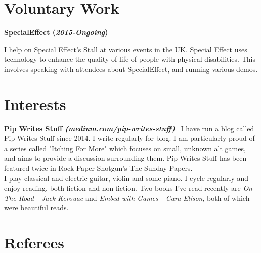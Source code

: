 \documentclass[10pt]{article} %
\begin{document}
\section{Voluntary Work}

\textbf{SpecialEffect (\textit{2015-Ongoing})}

I help on Special Effect's Stall at various events in the UK. Special Effect uses technology to enhance the quality of life of people with physical disabilities. This involves speaking with attendees about SpecialEffect, and running various demos.


\section{Interests}

\textbf{Pip Writes Stuff  \textit{(medium.com/pip-writes-stuff) }} \
I have run a blog called Pip Writes Stuff since 2014. I write regularly for blog. I am particularly proud of a series called "Itching For More" which focuses on small, unknown alt games, and aims to provide a discussion surrounding them. Pip Writes Stuff has been featured twice in Rock Paper Shotgun's The Sunday Papers.\\

I play classical and electric guitar, violin and some piano. I cycle regularly and enjoy reading, both fiction and non fiction. Two books I’ve read recently are \textit{On The Road - Jack Kerouac} and \textit{Embed with Games - Cara Elison}, both of which were beautiful reads.

\section{Referees}
\end{document}
